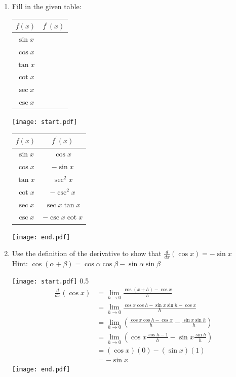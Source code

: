 \documentclass[12pt]{article}
\begin{document}
\begin{enumerate}

\item Fill in the given table:

\begin{center}
\begin{tabular}{c|c}
$f(x)$ & $f^{\prime}(x)$\\
\hline
$\sin{x}$ &  \\
\hline
$\cos{x}$ & \\
\hline
$\tan{x}$ & \\
\hline
$\cot{x}$ & \\
\hline
$\sec{x}$ & \\
\hline
$\csc{x}$ & 
\end{tabular}
\end{center}

\texttt{[image: start.pdf]}
{{
\begin{tabular}{c|c}
$f(x)$ & $f^{\prime}(x)$\\
\hline
$\sin{x}$ & $\cos{x}$  \\
\hline
$\cos{x}$ & $-\sin{x}$ \\
\hline
$\tan{x}$ & $\sec^2{x}$\\
\hline
$\cot{x}$ & $-\csc^2{x}$\\
\hline
$\sec{x}$ & $\sec{x}\tan{x}$\\
\hline
$\csc{x}$ & $-\csc{x}\cot{x}$ 
\end{tabular}
}}
\texttt{[image: end.pdf]}


\item Use the definition of the derivative to show that $\frac{d}{dx}(\cos{x})=-\sin{x}$\\
Hint: $\cos{(\alpha + \beta)}=\cos{\alpha}\cos{\beta}-\sin{\alpha}\sin{\beta}$

\texttt{[image: start.pdf]}
{{{0.5\linewidth}{
\begin{align*}
\frac{d}{dx}(\cos{x})&=\lim_{h \rightarrow 0}{\frac{\cos{(x+h)}-\cos{x}}{h}}\\
&=\lim_{h \rightarrow 0}{\frac{\cos{x}\cos{h}-\sin{x}\sin{h}-\cos{x}}{h}}\\
&=\lim_{h \rightarrow 0}{\left(\frac{\cos{x}\cos{h}-\cos{x}}{h}-\frac{\sin{x}\sin{h}}{h}\right)}\\
&=\lim_{h \rightarrow 0}{\left(\cos{x}\frac{\cos{h}-1}{h}-\sin{x}\frac{\sin{h}}{h}\right)}\\
&=(\cos{x})(0)-(\sin{x})(1)\\
&=-\sin{x}
\end{align*}
}}}
\texttt{[image: end.pdf]}



\end{enumerate}
\end{document}
